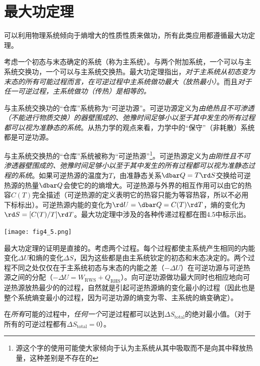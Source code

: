 \section{最大功定理}
\label{sec4.5}
可以利用物理系统倾向于熵增大的性质性质来做功，所有此类应用都遵循最大功定理。

考虑一个初态与末态确定的系统（称为主系统）。与两个附加系统，一个可以与主系统交换功，一个可以与主系统交换热。最大功定理指出，{\it 对于主系统从初态变为末态的所有可能过程而言，在可逆过程中主系统做功最大（放热最小）}。而且{\it 对于任一可逆过程，主系统做功（传热）是相等的。}

与主系统交换功的“仓库”系统称为“可逆功源”。可逆功源定义为{\it 由绝热且不可渗透（不能进行物质交换）的器壁围成的、弛豫时间足够小以至于其中发生的所有过程都可以视为准静态的系统}。从热力学的观点来看，力学中的“保守”（非耗散）系统都是可逆功源。

与主系统交换热的“仓库”系统被称为“可逆热源”\footnote{源这个字的使用可能使大家倾向于认为主系统从其中吸取而不是向其中释放热量，这种差别是不存在的}。可逆热源定义为{\it 由刚性且不可渗透器壁围成的、弛豫时间足够小以至于其中发生的所有过程都可以视为准静态过程的系统}。如果可逆热源的温度为$T$，由准静态关系$\dbar Q = T\rd S$交换给可逆热源的热量$\dbar Q$会使它的的熵增大。可逆热源与外界的相互作用可以由它的热容$C(T)$完全描述（可逆热源的定义表明它的热容只能为等容热容，所以不必用下标标出）。可逆热源内能的变化为$\rd U = \dbar Q = C(T) \rd T$，熵的变化为$\rd S = [C(T)/T] \rd T$。最大功定理中涉及的各种传递过程都在图4.5中标示出。

{
	\centering
	\texttt{[image: fig4\_5.png]}
}

最大功定理的证明是直接的。考虑两个过程。每个过程都使主系统产生相同的内能变化$\Delta U$和熵的变化$\Delta S$，因为这些都是由主系统钦定的初态和末态决定的。两个过程不同之处仅仅在于主系统初态与末态的内能之差（$-\Delta U$）在可逆功源与可逆热源之间的分配（$-\Delta U = W_{\text{RWS}} + Q_{\text{RHS}}$）。向可逆功源做功最大同时也相应地向可逆热源放热最少的的过程，自然就是引起可逆热源熵的变化最小的过程（因此也是整个系统熵变最小的过程，因为可逆功源的熵变为零、主系统的熵变确定）。

在{\it 所有}可能的过程中，{\it 任何一个}可逆过程都可以达到$\Delta S_{\text{total}}$的绝对最小值。（对于所有的可逆过程都有$\Delta S_{\text{total}} = 0$）。

